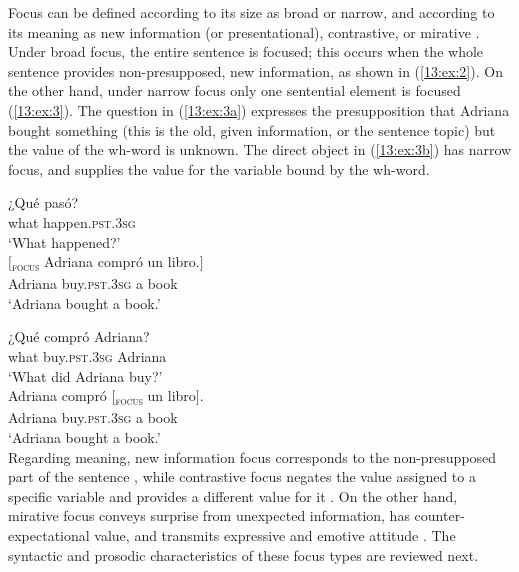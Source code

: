 \documentclass[output=paper,colorlinks,citecolor=brown,draftmode]{langscibook}
\begin{document}
Focus can be defined according to its size as broad or narrow, and according to its meaning as new information (or presentational), contrastive, or mirative \citep{DeLancey1997, Ladd2008,gussenhoven2008}. Under broad focus, the entire sentence is focused; this occurs when the whole sentence provides non-presupposed, new information, as shown in (\ref{13:ex:2}). On the other hand, under narrow focus only one sentential element is focused (\ref{13:ex:3}). The question in (\ref{13:ex:3a}) expresses the presupposition that Adriana bought something (this is the old, given information, or the sentence topic) but the value of the wh-word is unknown. The direct object in (\ref{13:ex:3b}) has narrow focus, and supplies the value for the variable bound by the wh-word.

\ea \label{13:ex:2}
\ea\label{13:ex:2a}
\gll   ¿Qué  pasó?\\
what happen.\textsc{pst}.3\textsc{sg}\\
\glt ‘What happened?’\\
\ex   \label{13:ex:2b}
\gll $[$\textsubscript{\textsc{focus}} Adriana compró un libro.$]$\\
{} Adriana  buy.\textsc{pst}.3\textsc{sg} a   book\\
\glt ‘Adriana bought a book.’  \\
\z
\z

\ea \label{13:ex:3}%
\ea \label{13:ex:3a}
\gll  ¿Qué compró Adriana?\\
what buy.\textsc{pst}.3\textsc{sg} Adriana\\
\glt ‘What did Adriana buy?’\\
\ex  \label{13:ex:3b}
\gll Adriana compró         $[$\textsubscript{\textsc{focus}} un libro$]$.\\
Adriana  buy.\textsc{pst}.3\textsc{sg} {} a   book\\
\glt ‘Adriana bought a book.’  \\
\z
\z
Regarding meaning, new information focus corresponds to the non-presupposed part of the sentence \citep{Zubizarreta1998, chomsky1971, Chomsky1976, Jackendoff1972}, while contrastive focus negates the value assigned to a specific variable and provides a different value for it \citep{Zubizarreta1998}. On the other hand, mirative focus conveys surprise from unexpected information, has counter-expectational value, and transmits expressive and emotive attitude \citep{machuca_ayusoyRios2017,DeLancey1997,DeLancey2001,DeLancey2012,Dickinson2000,Cruschina2012, gili2015intonational, Jiménez-Fernández2015a, Jiménez-Fernández2015b,BianchiCruschina2016,BadanCrocco2019,belletti2017syntax}. The syntactic and prosodic characteristics of these focus types are reviewed next.
\end{document}
